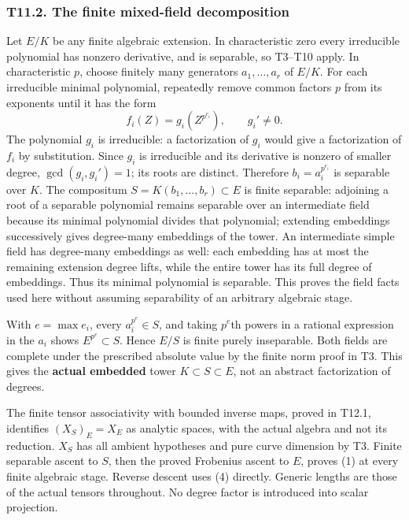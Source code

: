 \documentclass[
  10pt,
]{article}
\begin{document}
\subsubsection{T11.2. The finite mixed-field
decomposition}\label{t11.2.-the-finite-mixed-field-decomposition}

Let \(E/K\) be any finite algebraic extension. In characteristic zero
every irreducible polynomial has nonzero derivative, and is separable,
so T3--T10 apply. In characteristic \(p\), choose finitely many
generators \(a_1,\ldots,a_r\) of \(E/K\). For each irreducible minimal
polynomial, repeatedly remove common factors \(p\) from its exponents
until it has the form \[
                f_i(Z)=g_i(Z^{p^{e_i}}),\qquad g_i'\ne0.
                                                               \tag{29}
\] The polynomial \(g_i\) is irreducible: a factorization of \(g_i\)
would give a factorization of \(f_i\) by substitution. Since \(g_i\) is
irreducible and its derivative is nonzero of smaller degree,
\(\gcd(g_i,g_i')=1\); its roots are distinct. Therefore
\(b_i=a_i^{p^{e_i}}\) is separable over \(K\). The compositum
\(S=K(b_1,\ldots,b_r)\subset E\) is finite separable: adjoining a root
of a separable polynomial remains separable over an intermediate field
because its minimal polynomial divides that polynomial; extending
embeddings successively gives degree-many embeddings of the tower. An
intermediate simple field has degree-many embeddings as well: each
embedding has at most the remaining extension degree lifts, while the
entire tower has its full degree of embeddings. Thus its minimal
polynomial is separable. This proves the field facts used here without
assuming separability of an arbitrary algebraic stage.

With \(e=\max e_i\), every \(a_i^{p^e}\in S\), and taking \(p^e\)th
powers in a rational expression in the \(a_i\) shows
\(E^{p^e}\subset S\). Hence \(E/S\) is finite purely inseparable. Both
fields are complete under the prescribed absolute value by the finite
norm proof in T3. This gives the \textbf{actual embedded} tower
\(K\subset S\subset E\), not an abstract factorization of degrees.

The finite tensor associativity with bounded inverse maps, proved in
T12.1, identifies \((X_S)_E=X_E\) as analytic spaces, with the actual
algebra and not its reduction. \(X_S\) has all ambient hypotheses and
pure curve dimension by T3. Finite separable ascent to \(S\), then the
proved Frobenius ascent to \(E\), proves (1) at every finite algebraic
stage. Reverse descent uses (4) directly. Generic lengths are those of
the actual tensors throughout. No degree factor is introduced into
scalar projection.
\end{document}
